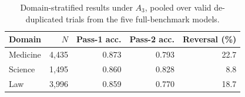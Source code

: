 \begin{table}[htbp]
\caption{Domain-stratified results under $A_3$, pooled over valid de-duplicated trials from the five full-benchmark models.}
\label{tab:domain}
\centering
\small
\setlength{\tabcolsep}{3.5pt}
\begin{tabular}{lrrrr}
\toprule
Domain & $N$ & Pass-1 acc. & Pass-2 acc. & Reversal (\%) \\
\midrule
Medicine & 4,435 & 0.873 & 0.793 & 22.7 \\
Science & 1,495 & 0.860 & 0.828 & 8.8 \\
Law & 3,996 & 0.859 & 0.770 & 18.7 \\
\bottomrule
\end{tabular}
\end{table}
